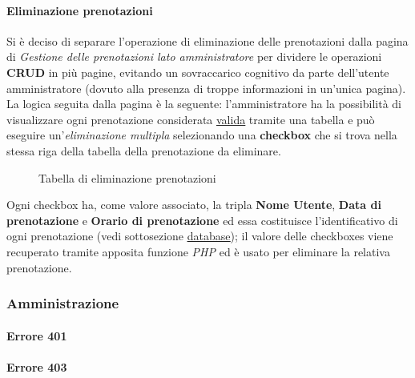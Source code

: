 \documentclass[]{article}
\begin{document}
\paragraph*{Eliminazione prenotazioni}
 Si è deciso di separare l'operazione di eliminazione delle prenotazioni dalla pagina di \textit{Gestione delle prenotazioni lato amministratore} per dividere le operazioni \textbf{CRUD} in più pagine, evitando un sovraccarico cognitivo da parte dell'utente amministratore (dovuto alla presenza di troppe informazioni in un'unica pagina). \\
La logica seguita dalla pagina è la seguente: l'amministratore ha la possibilità di visualizzare ogni prenotazione considerata \hyperref[prenotazioni:valida]{\underline{valida}} tramite una tabella e può eseguire un'\textit{eliminazione multipla} selezionando una \textbf{checkbox} che si trova nella stessa riga della tabella della prenotazione da eliminare. \\

\begin{figure}[H]
	\centering
	\caption{Tabella di eliminazione prenotazioni}
\end{figure}

Ogni checkbox ha, come valore associato, la tripla \textbf{Nome Utente}, \textbf{Data di prenotazione} e \textbf{Orario di prenotazione} ed essa costituisce l'identificativo di ogni prenotazione (vedi sottosezione \hyperref[subsec:database]{\underline{database}}); il valore delle checkboxes viene recuperato tramite apposita funzione \textit{PHP} ed è usato per eliminare la relativa prenotazione.

\subsubsection{Amministrazione}
\paragraph*{Errore 401}
\paragraph*{Errore 403}
\end{document}
